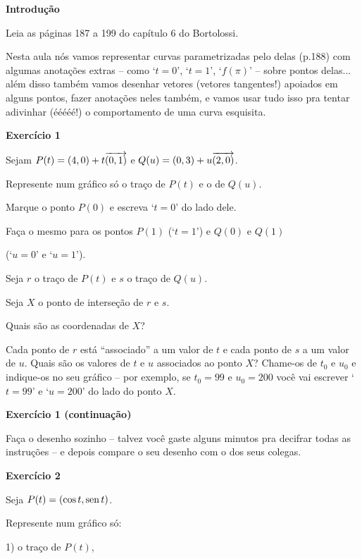 \documentclass[oneside,12pt]{article}
\begin{document}
{\bf Introdução}

Leia as páginas 187 a 199 do capítulo 6 do Bortolossi.

Nesta aula nós vamos representar curvas parametrizadas pelo
 delas (p.188) com algumas anotações extras -- como
`$t=0$', `$t=1$', `$f(π)$' -- sobre pontos delas... além disso também
vamos desenhar vetores (vetores tangentes!) apoiados em alguns pontos,
fazer anotações neles também, e vamos usar tudo isso pra tentar
adivinhar (ééééé!) o comportamento de uma curva esquisita.


\newpage

{\bf Exercício 1}

Sejam $P(t) = (4,0) + t{\overrightarrow{(0,1)}}$ e $Q(u) = (0,3) + u{\overrightarrow{(2,0)}}$.

Represente num gráfico só o traço de $P(t)$ e o de $Q(u)$.

Marque o ponto $P(0)$ e escreva `$t=0$' do lado dele.

Faça o mesmo para os pontos $P(1)$ (`$t=1$') e $Q(0)$ e $Q(1)$

(`$u=0$' e `$u=1$'). 

\msk

Seja $r$ o traço de $P(t)$ e $s$ o traço de $Q(u)$.

Seja $X$ o ponto de interseção de $r$ e $s$.

Quais são as coordenadas de $X$?

\msk

Cada ponto de $r$ está ``associado'' a um valor de $t$ e cada ponto de
$s$ a um valor de $u$. Quais são os valores de $t$ e $u$ associados ao
ponto $X$? Chame-os de $t_0$ e $u_0$ e indique-os no seu gráfico --
por exemplo, se $t_0=99$ e $u_0=200$ você vai escrever `$t=99$' e
`$u=200$' do lado do ponto $X$.

\newpage

{\bf Exercício 1 (continuação)}

Faça o desenho sozinho -- talvez você gaste alguns minutos pra
decifrar todas as instruções -- e depois compare o seu desenho com o
dos seus colegas.


\newpage

{\bf Exercício 2}

Seja $P(t) = (\cos t, \operatorname{sen} t)$.

Represente num gráfico só:

1) o traço de $P(t)$,
\end{document}
